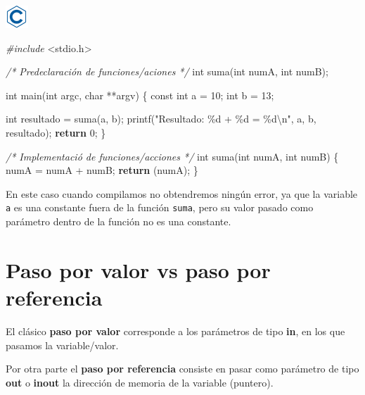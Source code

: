 \documentclass[
]{book}
\newenvironment{Shaded}{\begin{snugshade}}{\end{snugshade}}
\newcommand{\CommentTok}[1]{\textcolor[rgb]{0.56,0.35,0.01}{\textit{#1}}}
\newcommand{\ControlFlowTok}[1]{\textcolor[rgb]{0.13,0.29,0.53}{\textbf{#1}}}
\newcommand{\DataTypeTok}[1]{\textcolor[rgb]{0.13,0.29,0.53}{#1}}
\newcommand{\DecValTok}[1]{\textcolor[rgb]{0.00,0.00,0.81}{#1}}
\newcommand{\ImportTok}[1]{#1}
\newcommand{\NormalTok}[1]{#1}
\newcommand{\PreprocessorTok}[1]{\textcolor[rgb]{0.56,0.35,0.01}{\textit{#1}}}
\newcommand{\SpecialCharTok}[1]{\textcolor[rgb]{0.00,0.00,0.00}{#1}}
\newcommand{\StringTok}[1]{\textcolor[rgb]{0.31,0.60,0.02}{#1}}
\begin{document}
\includegraphics{./img/c.png}

\begin{Shaded}
\begin{Highlighting}[]
\PreprocessorTok{\#include }\ImportTok{\textless{}stdio.h\textgreater{}}

\CommentTok{/* Predeclaración de funciones/aciones */}
\DataTypeTok{int}\NormalTok{ suma(}\DataTypeTok{int}\NormalTok{ numA, }\DataTypeTok{int}\NormalTok{ numB);}

\DataTypeTok{int}\NormalTok{ main(}\DataTypeTok{int}\NormalTok{ argc, }\DataTypeTok{char}\NormalTok{ **argv) \{}
    \DataTypeTok{const} \DataTypeTok{int}\NormalTok{ a = }\DecValTok{10}\NormalTok{;}
    \DataTypeTok{int}\NormalTok{ b = }\DecValTok{13}\NormalTok{;}

    \DataTypeTok{int}\NormalTok{ resultado = suma(a, b);}
\NormalTok{    printf(}\StringTok{"Resultado: \%d + \%d = \%d}\SpecialCharTok{\textbackslash{}n}\StringTok{"}\NormalTok{, a, b, resultado);}
    \ControlFlowTok{return} \DecValTok{0}\NormalTok{;}
\NormalTok{\}}

\CommentTok{/* Implementació de funciones/acciones */}
\DataTypeTok{int}\NormalTok{ suma(}\DataTypeTok{int}\NormalTok{ numA, }\DataTypeTok{int}\NormalTok{ numB) \{}
\NormalTok{    numA = numA + numB;}
    \ControlFlowTok{return}\NormalTok{ (numA);}
\NormalTok{\}}
\end{Highlighting}
\end{Shaded}

En este caso cuando compilamos no obtendremos ningún error, ya que la variable \texttt{a} es una constante fuera de la función \texttt{suma}, pero su valor pasado como parámetro dentro de la función no es una constante.

\hypertarget{paso-por-valor-vs-paso-por-referencia}{%
\section{Paso por valor vs paso por referencia}\label{paso-por-valor-vs-paso-por-referencia}}

El clásico \textbf{paso por valor} corresponde a los parámetros de tipo \textbf{in}, en los que pasamos la variable/valor.

Por otra parte el \textbf{paso por referencia} consiste en pasar como parámetro de tipo \textbf{out} o \textbf{inout} la dirección de memoria de la variable (puntero).
\end{document}
